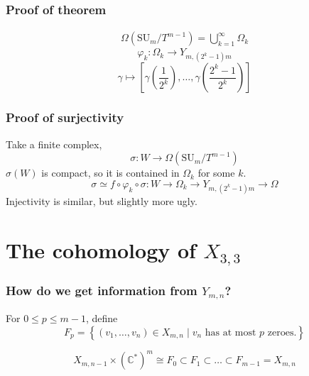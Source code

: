 \documentclass{beamer} %
\newcommand{\C}{\mathbb{C}}
\newcommand{\SUT}[1]{\SU_{#1}/T^{#1-1}}
\newcommand{\SU}{\mathrm{SU}}
\newcommand{\set}[1]{\left\{ #1 \right\}}
\newcommand{\g}{\gamma}
\begin{document}
\begin{frame}
  \frametitle{Proof of theorem}
  \begin{align*}
    \Omega(\SUT{m}) = \bigcup_{k=1}^\infty \Omega_k
  \end{align*} \pause
  \[ \varphi_k : \Omega_k \to Y_{m,(2^k-1)m} \]
  \[ \g \mapsto \left[\g\left(\frac{1}{2^k}\right),\dots,
    \g\left(\frac{2^k-1}{2^k}\right) \right] \]
\end{frame}

\begin{frame}
  \frametitle{Proof of surjectivity}
  Take a finite complex,
  \[ \sigma : W \to \Omega(\SUT{m}) \] \pause
  $\sigma(W)$ is compact, so it is contained in $\Omega_k$ for some
  $k$. \newline\pause
  \[ \sigma \simeq f \circ \varphi_k \circ \sigma : W \to \Omega_k \to
  Y_{m,(2^k-1)m} \to \Omega \] \newline\pause
  Injectivity is similar, but slightly more ugly.
\end{frame}

\section{The cohomology of $X_{3,3}$}

\begin{frame}
  \frametitle{How do we get information from $Y_{m,n}$?}
  \begin{definition}
    For $0 \leq p \leq m-1$, define
    \[ F_p = \set{(v_1,\dots,v_n) \in X_{m,n} \mid v_n \text{ has at
        most } p \text{ zeroes.} } \]
  \end{definition} \pause
  \[ X_{m,n-1}\times (\C^*)^m \cong F_0 \subset F_1 \subset \dots
  \subset F_{m-1} = X_{m,n} \]
  
\end{frame}

\end{document}

